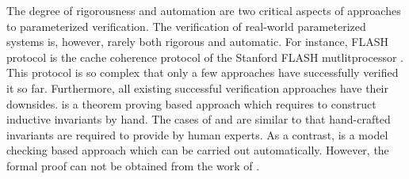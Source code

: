 \documentclass[conference]{IEEEtran}
\begin{document}
The degree of rigorousness and automation are two critical aspects of approaches to parameterized verification.
The verification of real-world parameterized systems is, however,  rarely  both rigorous and automatic.
{For instance, FLASH protocol is the cache coherence protocol of the Stanford FLASH mutlitprocessor \cite{FLASHCache}. This protocol is so complex that only a few approaches  \cite{Park1996a,McMillan2001,Chou2004,Conchon2013} have successfully verified it so far. Furthermore, all existing  successful verification approaches have their downsides.  \cite{Park1996a} is a theorem proving based approach which requires
to construct inductive invariants by hand. The cases of \cite{McMillan2001} and \cite{Chou2004} are similar to \cite{Park1996a} that hand-crafted invariants are required to
provide by human experts. As a contrast, \cite{Conchon2013} is a model checking based approach which can be carried out automatically. However, the formal proof can not be obtained from the work of \cite{Conchon2013}.
}
\end{document}
